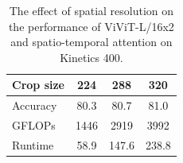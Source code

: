 \begin{table}[t]
	\centering
	\caption{The effect of spatial resolution on the performance of ViViT-L/16x2 and spatio-temporal attention on Kinetics 400.}
	\vspace{0.1em}
	\small{
	\begin{tabular}{lccc}
		\toprule
		Crop size & 224         & 288         & 320        \\ \midrule
		Accuracy &   80.3          &  80.7            &   81.0         \\   %
		GFLOPs    &     1446        &   2919          &   3992         \\
		Runtime  &     58.9        &      147.6       &    238.8       \\
		\bottomrule
	\end{tabular}
	\vspace{-0.5\baselineskip}
	\label{tab:ablation_spatial_resolution}
	}
\end{table}

